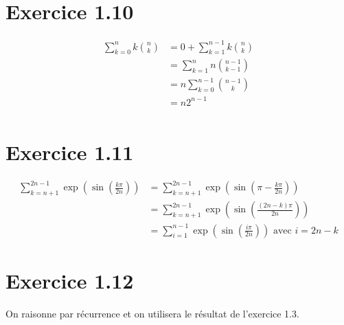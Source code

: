 \documentclass{report}
\begin{document}
\section*{Exercice 1.10}
\begin{equation*}
	\begin{split}
		\sum_{k=0}^{n} k\binom{n}{k} &= 0 + \sum_{k=1}^{n-1} k\binom{n}{k} \\
		                             &= \sum_{k=1}^{n} n\binom{n-1}{k-1} \\
		                             &= n\sum_{k=0}^{n-1} \binom{n-1}{k} \\
		                             &= n 2^{n-1} \\
	\end{split}
\end{equation*}


\section*{Exercice 1.11}
\begin{equation*}
	\begin{split}
		\sum_{k=n+1}^{2n-1} \exp \left(\sin \left(\frac{k\pi}{2n}\right)\right)
			&= \sum_{k=n+1}^{2n-1} \exp \left(\sin \left(\pi - \frac{k\pi}{2n}\right)\right) \\
			&= \sum_{k=n+1}^{2n-1} \exp \left(\sin \left( \frac{(2n-k)\pi}{2n}\right)\right) \\
			&= \sum_{i=1}^{n-1} \exp \left(\sin \left( \frac{i\pi}{2n}\right)\right) \text{ avec $i = 2n-k$}
	\end{split}
\end{equation*}

\section*{Exercice 1.12}

On raisonne par récurrence et on utilisera le résultat de l'exercice 1.3.
\end{document}

